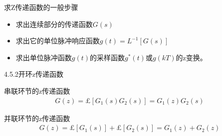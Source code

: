 \begin{frame}
\begin{block}{求Z传递函数的一般步骤}
\begin{itemize}
\item 求出连续部分的传递函数$G(s)$
\item 求出它的单位脉冲响应函数$g(t)=L^{-1}[G(s)]$
\item 求出单位脉冲函数$g(t)$的采样函数$g^*(t)$或$g(kT)$的z变换。
\end{itemize}
\end{block}
\end{frame}

\begin{frame}{4.5.2开环z传递函数}
\begin{block}{串联环节的z传递函数}
\begin{eqnarray*}
G(z)=\pounds[G_1(s)G_2(s)]=G_1(z)G_2(s)
\end{eqnarray*}
\end{block}
\begin{block}{并联环节的z传递函数}
\begin{eqnarray*}
G(z)=\pounds[G_1(s)]+\pounds[G_2(s)]=G_1(z)+G_2(z)
\end{eqnarray*}
\end{block}
\end{frame}


